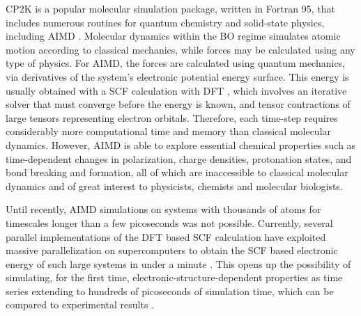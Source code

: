 CP2K \cite{hutter2014cp2k} is a popular molecular simulation package, written in Fortran 95, that includes numerous routines for quantum chemistry and solid-state physics, including \ac{AIMD} \cite{marx2009ab}.
Molecular dynamics within the \ac{BO} regime simulates atomic motion according to classical mechanics, while forces may be calculated using any type of physics.
For \ac{AIMD}, the forces are calculated using quantum mechanics, via derivatives of the system's electronic potential energy surface.
This energy is usually obtained with a \ac{SCF} calculation with \ac{DFT} \cite{vandevondele2012linear,hutter2014cp2k}, which involves an iterative solver that must converge before the energy is known, and tensor contractions of large tensors representing electron orbitals.
Therefore, each time-step requires considerably more computational time and memory than classical molecular dynamics.
However, \ac{AIMD} is able to explore essential chemical properties such as time-dependent changes in polarization, charge densities, protonation states, and bond breaking and formation, all of which are inaccessible to classical molecular dynamics and of great interest to physicists, chemists and molecular biologists.

Until recently, \ac{AIMD} simulations on systems with thousands of atoms for timescales longer than a few picoseconds was not possible.
Currently, several parallel implementations of the \ac{DFT} based \ac{SCF} calculation have exploited massive parallelization on supercomputers to obtain the \ac{SCF} based electronic energy of such large systems in under a minute \cite{vasp_bench,kresse1996efficient,cp2k_bench,vandevondele2012linear}.
This opens up the possibility of simulating, for the first time, electronic-structure-dependent properties as time series extending to hundreds of picoseconds of simulation time, which can be compared to experimental results \cite{gillan2016perspective,pestana2017ab,hassanali2013proton,milovanovic2018new,sellner2013charge}.

